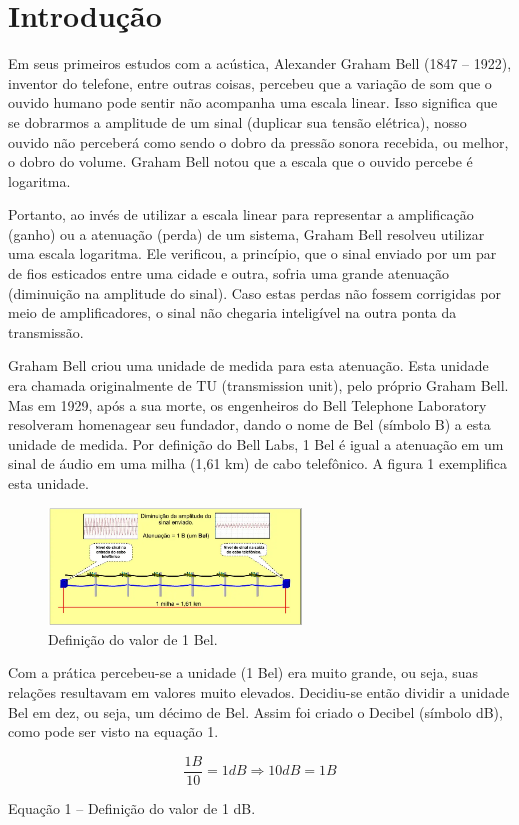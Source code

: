 \section{Introdução}
Em seus primeiros estudos com a acústica, Alexander Graham Bell (1847 – 1922), inventor do telefone, entre outras coisas, percebeu que a variação de som que o ouvido humano pode sentir não acompanha uma escala linear.
Isso significa que se dobrarmos a amplitude de um sinal (duplicar sua tensão elétrica), nosso ouvido não perceberá como sendo o dobro da pressão sonora recebida, ou melhor, o dobro do volume. Graham Bell notou que a escala que o ouvido percebe é logaritma.

Portanto, ao invés de utilizar a escala linear para representar a amplificação (ganho) ou a atenuação (perda) de um sistema, Graham Bell resolveu utilizar uma escala logaritma. Ele verificou, a princípio, que o sinal enviado por um par de fios esticados entre uma cidade e outra, sofria uma grande atenuação (diminuição na amplitude do sinal). Caso estas perdas não fossem corrigidas por meio de amplificadores, o sinal não chegaria inteligível na outra ponta da transmissão.

Graham Bell criou uma unidade de medida para esta atenuação. Esta unidade era chamada originalmente de TU (transmission unit), pelo próprio Graham Bell. Mas em 1929, após a sua morte, os engenheiros do Bell Telephone Laboratory resolveram homenagear seu fundador, dando o nome de Bel (símbolo B) a esta unidade de medida. Por definição do Bell Labs, 1 Bel é igual a atenuação em um sinal de áudio em uma milha (1,61 km) de cabo telefônico. A figura 1 exemplifica esta unidade.

\begin{figure}[hb]
    \centering
    \includegraphics[width=0.6\textwidth]{imgs/bel_e_decibel_unidade.png}
    \caption{Definição do valor de 1 Bel.}
    \label{fig:my_label}
\end{figure}

Com a prática percebeu-se a unidade (1 Bel) era muito grande, ou seja, suas relações resultavam em valores muito elevados. Decidiu-se então dividir a unidade Bel em dez, ou seja, um décimo de Bel. Assim foi criado o Decibel (símbolo dB), como pode ser visto na equação 1.

$$
    \frac{1B}{10}= 1dB \Rightarrow 10dB = 1B
$$

\begin{center}
    Equação 1 – Definição do valor de 1 dB.
\end{center}